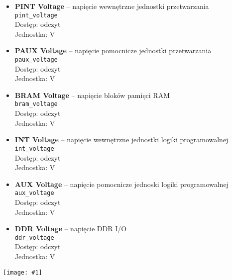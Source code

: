 \documentclass[12pt,a4paper]{article}
\newcommand{\screenshot}[1]{\begin{minipage}[c]{\textwidth}\texttt{[image: \#1]}\end{minipage}}
\begin{document}
	\begin{itemize}
		\item \textbf{PINT Voltage} -- napięcie wewnętrzne jednostki przetwarzania\\
			  \texttt{pint\_voltage}\\
			  Dostęp: odczyt\\
			  Jednostka: V
		\item \textbf{PAUX Voltage} -- napięcie pomocnicze jednostki przetwarzania\\
			  \texttt{paux\_voltage}\\
			  Dostęp: odczyt\\
			  Jednostka: V
		\item \textbf{BRAM Voltage} -- napięcie bloków pamięci RAM\\
			  \texttt{bram\_voltage}\\
			  Dostęp: odczyt\\
			  Jednostka: V
		\item \textbf{INT Voltage} -- napięcie wewnętrzne jednostki logiki programowalnej\\
			  \texttt{int\_voltage}\\
			  Dostęp: odczyt\\
			  Jednostka: V
		\item \textbf{AUX Voltage} -- napięcie pomocnicze jednoski logiki programowalnej\\
			  \texttt{aux\_voltage}\\
			  Dostęp: odczyt\\
			  Jednostka: V
		\item \textbf{DDR Voltage} -- napięcie DDR I/O\\
			  \texttt{ddr\_voltage}\\
			  Dostęp: odczyt\\
			  Jednostka: V
	\end{itemize}
	\screenshot{screenshots/expert.png}
\end{document}
